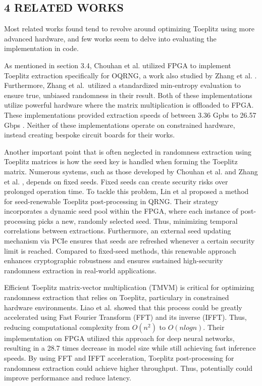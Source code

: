\documentclass{sigchi}
\begin{document}
\subsection{\texorpdfstring{4 RELATED WORKS }{4 RELATED WORKS }}\label{related-works}

Most related works found tend to revolve around optimizing Toeplitz using more advanced hardware, and few works seem to delve into evaluating the implementation in code.

As mentioned in section 3.4, Chouhan et al. \cite{toeplitz-desc} utilized FPGA to implement Toeplitz extraction specifically for OQRNG, a work also studied by Zhang et al. \cite{toeplitz}. Furthermore, Zhang et al.~utilized a standardized min-entropy evaluation to ensure true, unbiased randomness in their result. Both of these implementations utilize powerful hardware where the matrix multiplication is offloaded to FPGA. These implementations provided extraction speeds of between 3.36 Gpbs \cite{toeplitz} to 26.57 Gbps \cite{toeplitz-desc}. Neither of these implementations operate on constrained hardware, instead creating bespoke circuit boards for their works.

Another important point that is often neglected in randomness extraction using Toeplitz matrices is how the seed key is handled when forming the Toeplitz matrix. Numerous systems, such as those developed by Chouhan et al. \cite{toeplitz-desc} and Zhang et al. \cite{toeplitz}, depends on fixed seeds. Fixed seeds can create security risks over prolonged operation time. To tackle this problem, Lin et al \cite{lin} proposed a method for seed-renewable Toeplitz post-processing in QRNG. Their strategy incorporates a dynamic seed pool within the FPGA, where each instance of post-processing picks a new, randomly selected seed. Thus, minimizing temporal correlations between extractions. Furthermore, an external seed updating mechanism via PCIe ensures that seeds are refreshed whenever a certain security limit is reached. Compared to fixed-seed methods, this renewable approach enhances cryptographic robustness and ensures sustained high-security randomness extraction in real-world applications.

Efficient Toeplitz matrix-vector multiplication (TMVM) is critical for optimizing randomness extraction that relies on Toeplitz, particulary in constrained hardware environments. Liao et al. \cite{liao} showed that this process could be greatly accelerated using Fast Fourier Transform (FFT) and its inverse (IFFT). Thus, reducing computational complexity from \(O(n^2)\) to \(O(n log n)\). Their implementation on FPGA utilized this approach for deep neural networks, resulting in a 28.7 times decrease in model size while still achieving fast inference speeds. By using FFT and IFFT acceleration, Toeplitz post-processing for randomness extraction could achieve higher throughput. Thus, potentially could improve performance and reduce latency.
\end{document}
